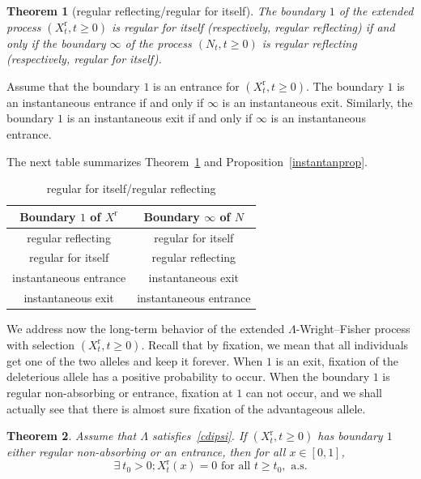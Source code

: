 \documentclass[10pt]{amsart}
\newtheorem{theo}{Theorem}[section]
\theoremstyle{definition}\newtheorem{defi}[theo]{Definition}\newtheorem{rema}[theo]{Remark}\newtheorem{exam}[theo]{Example}\newtheorem{exem}[theo]{Example}\newtheorem{nota}[theo]{Notation}
\newcommand{\rmr}{\mathrm{r}}
\let\oldexists\exists
\renewcommand*{\exists}{\mathrel{\oldexists}}
\begin{document}
\begin{theo}[regular reflecting/regular for itself]\label{regularforitself}
The boundary $1$ of the extended process $(X_t^{\rmr},t\geq 0)$ is regular for itself (respectively, regular reflecting) if and only if the boundary $\infty$ of the process $(N_t,t\geq 0) $ is regular reflecting (respectively, regular for itself).
\end{theo}

\begin{prop}\label{instantanprop}
Assume that the boundary $1$ is an entrance for $(X_t^{\rmr},t\geq 0)$. The boundary $1$ is an instantaneous entrance if and only if $\infty$ is an instantaneous exit. Similarly, the boundary $1$ is an instantaneous exit if and only if $\infty$ is an instantaneous entrance.
\end{prop}

The next table summarizes Theorem~\ref{regularforitself} and Proposition~\ref{instantanprop}.
\begin{table}[htpb]
\caption{regular for itself/regular reflecting}\label{correspondancereg}
\begin{center}
\begin{tabular}{|c|c|}
\hline Boundary $1$ of $X^{\rmr}$ & Boundary $\infty$ of $N$ \\
\hline regular reflecting & regular for itself\\
\hline regular for itself & regular reflecting \\
\hline instantaneous entrance & instantaneous exit \\
\hline instantaneous exit & instantaneous entrance \\
\hline
\end{tabular}
\vspace*{2mm}
\end{center}
\end{table}

We address now the long-term behavior of the extended $\Lambda$-Wright--Fisher process with selection $(X^{\rmr}_t,t\geq 0)$. Recall that by fixation, we mean that all individuals get one of the two alleles and keep it forever. When $1$ is an exit, fixation of the deleterious allele has a positive probability to occur. When the boundary $1$ is regular non-absorbing or entrance, fixation at $1$ can not occur, and we shall actually see that there is almost sure fixation of the advantageous allele.

\begin{theo}\label{fixationat0}
Assume that $\Lambda$ satisfies~\eqref{cdipsi}. If $(X_t^{\rmr},t\geq 0)$
has boundary $1$ either regular non-absorbing or an entrance, then for all $x\in [0,1]$,
\[
\exists \ t_0>0; X_t^{\rmr}(x)=0 \text{ for all } t\geq t_0, \text{ a.s.}
\]
\end{theo}
\end{document}
